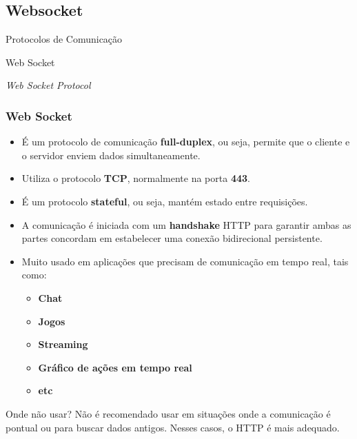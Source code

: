 \documentclass[
	10pt, %
	t, %
]{beamer}
\begin{document}
\subsection{Websocket}

\begin{frame}
	\begin{center}
		
		\bigskip\bigskip\bigskip\bigskip %
		{\Large Protocolos de Comunicação}
		
		\bigskip\bigskip %
		{\Huge Web Socket}
		
		\smallskip
		{\small \textit{Web Socket Protocol}}
	\end{center}

\end{frame}

\begin{frame}
	\frametitle{Web Socket}

	\begin{itemize}
		\item É um protocolo de comunicação \textbf{full-duplex}, ou seja, permite que o cliente e o servidor enviem dados simultaneamente.
		\item Utiliza o protocolo \textbf{TCP}, normalmente na porta \textbf{443}.
		\item É um protocolo \textbf{stateful}, ou seja, mantém estado entre requisições.
		\item A comunicação é iniciada com um \textbf{handshake} HTTP para garantir ambas as partes concordam em estabelecer uma conexão bidirecional persistente.
		\item Muito usado em aplicações que precisam de comunicação em tempo real, tais como: 
		\begin{itemize}
			\item \textbf{Chat}
			\item \textbf{Jogos}
			\item \textbf{Streaming}
			\item \textbf{Gráfico de ações em tempo real}
			\item \textbf{etc}
		\end{itemize}
	\end{itemize}

	\begin{alertblock}{Onde não usar?}
		Não é recomendado usar em situações onde a comunicação é pontual ou para buscar dados antigos. Nesses casos, o HTTP é mais adequado.
	\end{alertblock}


\end{frame}
\end{document}
